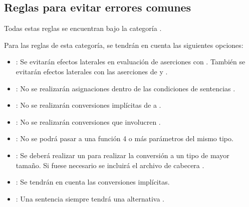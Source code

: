 \subsection{Reglas para evitar errores comunes}

Todas estas reglas se encuentran bajo la categoría .

Para las reglas de esta categoría, se tendrán en cuenta las siguientes
opciones:

\begin{itemize}

\item {}:
Se evitarán efectos laterales en evaluación de aserciones con .
También se evitarán efectos laterales con las aserciones de  
 y .

\item {}:
No se realizarán asignaciones dentro de las condiciones de sentencias .

\item {}:
No se realizarán conversiones implícitas de  a .

\item {}:
No se realizarán conversiones que involucren .

\item {}: No se podrá pasar a una
función 4 o más parámetros del mismo tipo.

\item {}: Se deberá
realizar un  para realizar la conversión a un tipo
de mayor tamaño. Si fuese necesario se incluirá el archivo de cabecera 
.

\item {}: Se tendrán en cuenta las
conversiones implícitas.

\item {}:
Una sentencia  siempre tendrá una alternativa .

\end{itemize}
